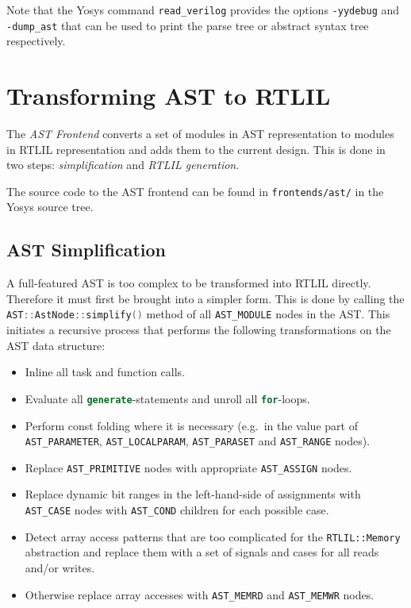 Note that the Yosys command {\tt read\_verilog} provides the options {\tt -yydebug}
and {\tt -dump\_ast} that can be used to print the parse tree or abstract syntax tree
respectively.

\section{Transforming AST to RTLIL}

The {\it AST Frontend} converts a set of modules in AST representation to
modules in RTLIL representation and adds them to the current design. This is done
in two steps: {\it simplification} and {\it RTLIL generation}.

The source code to the AST frontend can be found in {\tt frontends/ast/} in the Yosys source tree.

\subsection{AST Simplification}

A full-featured AST is too complex to be transformed into RTLIL directly. Therefore it must
first be brought into a simpler form. This is done by calling the \lstinline[language=C++]{AST::AstNode::simplify()}
method of all {\tt AST\_MODULE} nodes in the AST. This initiates a recursive process that performs the following transformations
on the AST data structure:

\begin{itemize}
\item Inline all task and function calls.
\item Evaluate all \lstinline[language=Verilog]{generate}-statements and unroll all \lstinline[language=Verilog]{for}-loops.
\item Perform const folding where it is necessary (e.g.~in the value part of {\tt AST\_PARAMETER}, {\tt AST\_LOCALPARAM},
{\tt AST\_PARASET} and {\tt AST\_RANGE} nodes).
\item Replace {\tt AST\_PRIMITIVE} nodes with appropriate {\tt AST\_ASSIGN} nodes.
\item Replace dynamic bit ranges in the left-hand-side of assignments with {\tt AST\_CASE} nodes with {\tt AST\_COND} children
for each possible case.
\item Detect array access patterns that are too complicated for the {\tt RTLIL::Memory} abstraction and replace them
with a set of signals and cases for all reads and/or writes.
\item Otherwise replace array accesses with {\tt AST\_MEMRD} and {\tt AST\_MEMWR} nodes.
\end{itemize}

